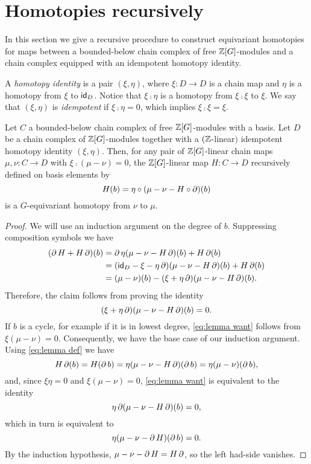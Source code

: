 
\section{Homotopies recursively}\label{s:equivariant homotopy general}

In this section we give a recursive procedure to construct equivariant homotopies for maps between a bounded-below chain complex of free $\mathbb{Z}[G]$-modules and a chain complex equipped with an idempotent homotopy identity.

\begin{definition}
	A \textit{homotopy identity} is a pair $(\xi,\eta)$, where $\xi \colon D \to D$ is a chain map and $\eta$ is a homotopy from $\xi$ to $\mathsf{id}_D$.
	Notice that $\xi \comp \eta$ is a homotopy from $\xi \comp \xi$ to $\xi$.
	We say that $(\xi, \eta)$ is \textit{idempotent} if $\xi \comp \eta = 0$, which implies $\xi \comp \xi = \xi$.
\end{definition}

\begin{theorem}\label{t:recursive_homotopy}
	Let $C$ a bounded-below chain complex of free $\mathbb{Z}[G]$-modules with a basis.
	Let $D$ be a chain complex of $\mathbb{Z}[G]$-modules together with a $(\mathbb{Z}$-linear$)$ idempotent homotopy identity $(\xi, \eta)$.
	Then, for any pair of $\mathbb{Z}[G]$-linear chain maps $\mu,\nu \colon C \to D$ with $\xi \comp (\mu -\nu) = 0$, the $\mathbb{Z}[G]$-linear map $H \colon C \to D$ recursively defined on basis elements by
	\begin{equation}\label{eq:lemma def}
		H(b) = \eta \mathbin{\circ} (\mu - \nu - H \mathbin{\circ} \operatorname{\partial})(b)
	\end{equation}
	is a $G$-equivariant homotopy from $\nu$ to $\mu$.
\end{theorem}

\begin{proof}
	We will use an induction argument on the degree of $b$.
	Suppressing composition symbols we have
	\begin{align*}
		(\operatorname{\partial} H + H \operatorname{\partial})(b)
		&= \operatorname{\partial} \eta(\mu - \nu - H \operatorname{\partial})(b) + H \operatorname{\partial} (b) \\
		&= (\mathsf{id}_D - \xi - \eta \operatorname{\partial})(\mu - \nu - H \operatorname{\partial})(b) + H \operatorname{\partial}(b) \\
		&= (\mu-\nu)(b) - (\xi + \eta \operatorname{\partial})(\mu - \nu - H \operatorname{\partial})(b).
	\end{align*}
	Therefore, the claim follows from proving the identity
	\begin{equation}\label{eq:lemma want}
		(\xi + \eta \operatorname{\partial})(\mu - \nu - H \operatorname{\partial})(b) = 0.
	\end{equation}
	If $b$ is a cycle, for example if it is in lowest degree, \eqref{eq:lemma want} follows from $\xi(\mu-\nu) = 0$.
	Consequently, we have the base case of our induction argument.
	Using \eqref{eq:lemma def} we have
	\[
	H\operatorname{\partial} (b) = H(\operatorname{\partial} b) = \eta(\mu-\nu-H\operatorname{\partial})(\operatorname{\partial} b) = \eta(\mu-\nu)(\operatorname{\partial} b),
	\]
	and, since $\xi \eta = 0$ and $\xi(\mu-\nu)=0$, \eqref{eq:lemma want} is equivalent to the identity
	\[
	\eta \operatorname{\partial} (\mu-\nu - H\operatorname{\partial})(b) = 0,
	\]
	which in turn is equivalent to
	\[
	\eta (\mu-\nu - \operatorname{\partial} H)(\operatorname{\partial} b) = 0.
	\]
	By the induction hypothesis, $\mu-\nu-\operatorname{\partial} H = H\operatorname{\partial}$, so the left had-side vanishes.
\end{proof}

